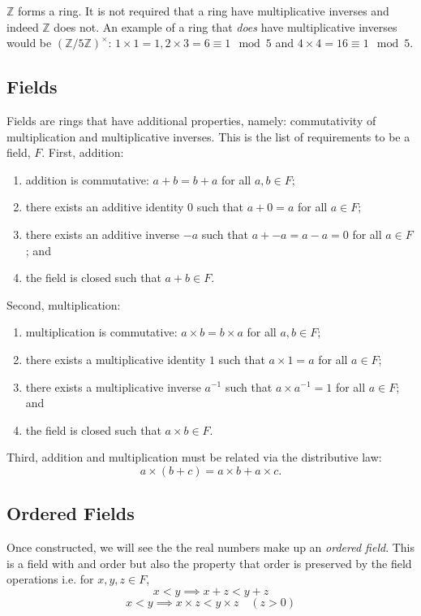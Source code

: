 \documentclass[]{scrartcl}
\theoremstyle{definition}
\newcommand{\bb}[1]{\mathbb{#1}}
\newcommand{\Z}{\bb{Z}}
\begin{document}
$\Z$ forms a ring. It is not required that a ring have multiplicative inverses and indeed $\Z$ does not. An example of a ring that \textit{does} have multiplicative inverses would be $(\Z/5\Z)^{\times}$: $1\times1 = 1, 2\times3 = 6 \equiv 1 \mod 5$ and $4\times4 = 16 \equiv 1 \mod 5$.

\subsection{Fields}
Fields are rings that have additional properties, namely: commutativity of multiplication and multiplicative inverses. This is the list of requirements to be a field, $F$. First, addition:
\begin{enumerate}[label=A\arabic*.]
    \item addition is commutative: $a+b=b+a$ for all $a, b \in F$;
    \item there exists an additive identity $0$ such that $a+0=a$ for all $a\in F$;
    \item there exists an additive inverse $-a$ such that $a+-a=a-a=0$ for all $a\in F$; and
    \item the field is closed such that $a+b \in F$.
\end{enumerate}
Second, multiplication:
\begin{enumerate}[label=M\arabic*.]
    \item multiplication is commutative: $a\times b=b\times a$ for all $a, b \in F$;
    \item there exists a multiplicative identity $1$ such that $a\times1=a$ for all $a\in F$;
    \item there exists a multiplicative inverse $a^{-1}$ such that $a\times a^{-1} = 1$ for all $a\in F$; and
    \item the field is closed such that $a\times b \in F$.
\end{enumerate}
Third, addition and multiplication must be related via the distributive law:
$$
a\times(b+c) = a\times b + a\times c.
$$


\subsection{Ordered Fields}
Once constructed, we will see the the real numbers make up an \textit{ordered field}. This is a field with and order but also the property that order is preserved by the field operations i.e. for $x, y, z \in F$,
$$
x < y \implies x+z < y+z
$$
$$
x < y \implies x\times z < y\times z\quad (z>0)
$$
\end{document}
